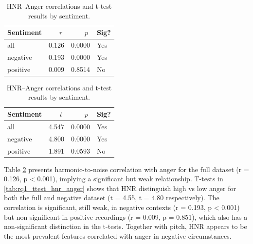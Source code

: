   \begin{table}[H]
    \centering
  
    \begin{subtable}{0.45\textwidth}
      \centering
      \caption{HNR and Anger (r)}\label{tab:rq1_corr_hnr_anger}
      \begin{tabular}{l r r l}
        \toprule
        Sentiment & \(\;r\;\) & \(\;p\;\) & Sig? \\
        \midrule
        all      & 0.126 & 0.0000 & Yes \\
        negative & 0.193 & 0.0000 & Yes \\
        positive & 0.009 & 0.8514 & No  \\
        \bottomrule
      \end{tabular}
    \end{subtable}\hfill
    \begin{subtable}{0.45\textwidth}
      \centering
      \caption{HNR and Anger (t-test)}\label{tab:rq1_ttest_hnr_anger}
      \begin{tabular}{l r r l}
        \toprule
        Sentiment & \(\;t\;\) & \(\;p\;\) & Sig? \\
        \midrule
        all      & 4.547 & 0.0000 & Yes \\
        negative & 4.800 & 0.0000 & Yes \\
        positive & 1.891 & 0.0593 & No  \\
        \bottomrule
      \end{tabular}
    \end{subtable}
  
    \caption{HNR–Anger correlations and t-test results by sentiment.}
    \label{tab:rq1_hnr_anger_side_by_side}
  \end{table}
  
  Table \ref{tab:rq1_hnr_anger_side_by_side} presents harmonic-to-noise correlation with anger for the full dataset (r = 0.126, p < 0.001), implying a significant but weak relationship. 
  T-tests in \ref{tab:rq1_ttest_hnr_anger} shows that HNR distinguish high vs low anger for both the full and negative dataset (t = 4.55, t = 4.80 respectively).
  The correlation is significant, still weak, in negative contexts (r = 0.193, p < 0.001) but non-significant in positive recordings (r = 0.009, p = 0.851), which also has a non-significant distinction in the t-tests.
  Together with pitch, HNR appears to be the most prevalent features correlated with anger in negative circumstances. 
  
